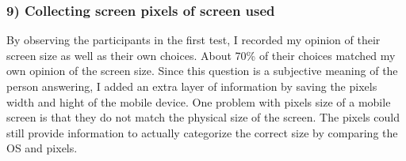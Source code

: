     \subsubsection*{9) Collecting screen pixels of screen used}
    By observing the participants in the first test, I recorded my opinion of their screen size as well as their own choices. About 70\% of their choices matched my own opinion of the screen size. Since this question is a subjective meaning of the person answering, I added an extra layer of information by saving the pixels width and hight of the mobile device. One problem with pixels size of a mobile screen is that they do not match the physical size of the screen. The pixels could still provide information to actually categorize the correct size by comparing the OS and pixels.

    \begin{figure}[H]
      \centering
\end{figure}
